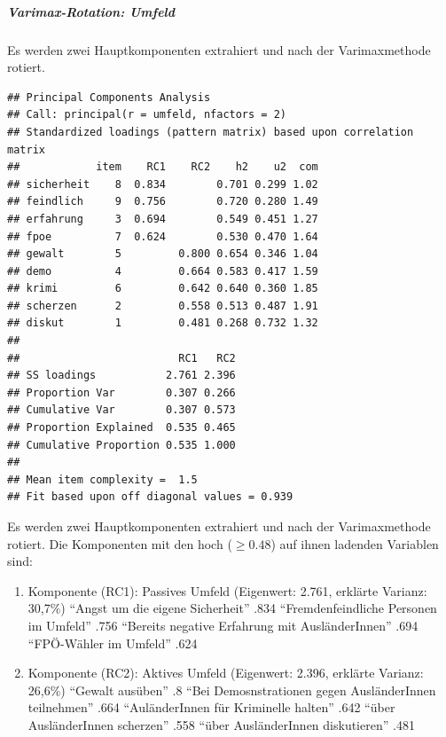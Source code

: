 \documentclass[]{article}
\newenvironment{Shaded}{\begin{snugshade}}{\end{snugshade}}
\newcommand{\KeywordTok}[1]{\textcolor[rgb]{0.13,0.29,0.53}{\textbf{{#1}}}}
\newcommand{\DataTypeTok}[1]{\textcolor[rgb]{0.13,0.29,0.53}{{#1}}}
\newcommand{\DecValTok}[1]{\textcolor[rgb]{0.00,0.00,0.81}{{#1}}}
\newcommand{\FloatTok}[1]{\textcolor[rgb]{0.00,0.00,0.81}{{#1}}}
\newcommand{\StringTok}[1]{\textcolor[rgb]{0.31,0.60,0.02}{{#1}}}
\newcommand{\OtherTok}[1]{\textcolor[rgb]{0.56,0.35,0.01}{{#1}}}
\newcommand{\NormalTok}[1]{{#1}}
\providecommand{\tightlist}{%
  \setlength{\itemsep}{0pt}\setlength{\parskip}{0pt}}
\let\oldsubparagraph\subparagraph
\renewcommand{\subparagraph}[1]{\oldsubparagraph{#1}\mbox{}}
\begin{document}
\subparagraph{Varimax-Rotation: Umfeld}\label{varimax-rotation-umfeld}

Es werden zwei Hauptkomponenten extrahiert und nach der Varimaxmethode
rotiert.

\begin{Shaded}
\end{Shaded}

\begin{verbatim}
## Principal Components Analysis
## Call: principal(r = umfeld, nfactors = 2)
## Standardized loadings (pattern matrix) based upon correlation matrix
##            item    RC1    RC2    h2    u2  com
## sicherheit    8  0.834        0.701 0.299 1.02
## feindlich     9  0.756        0.720 0.280 1.49
## erfahrung     3  0.694        0.549 0.451 1.27
## fpoe          7  0.624        0.530 0.470 1.64
## gewalt        5         0.800 0.654 0.346 1.04
## demo          4         0.664 0.583 0.417 1.59
## krimi         6         0.642 0.640 0.360 1.85
## scherzen      2         0.558 0.513 0.487 1.91
## diskut        1         0.481 0.268 0.732 1.32
## 
##                         RC1   RC2
## SS loadings           2.761 2.396
## Proportion Var        0.307 0.266
## Cumulative Var        0.307 0.573
## Proportion Explained  0.535 0.465
## Cumulative Proportion 0.535 1.000
## 
## Mean item complexity =  1.5
## Fit based upon off diagonal values = 0.939
\end{verbatim}

Es werden zwei Hauptkomponenten extrahiert und nach der Varimaxmethode
rotiert. Die Komponenten mit den hoch (\(\ge 0.48\)) auf ihnen ladenden
Variablen sind:

\begin{enumerate}
\def\labelenumi{\arabic{enumi}.}
\tightlist
\item
  Komponente (RC1): Passives Umfeld (Eigenwert: 2.761, erklärte Varianz:
  30,7\%) ``Angst um die eigene Sicherheit'' .834 ``Fremdenfeindliche
  Personen im Umfeld'' .756 ``Bereits negative Erfahrung mit
  AusländerInnen'' .694 ``FPÖ-Wähler im Umfeld'' .624
\item
  Komponente (RC2): Aktives Umfeld (Eigenwert: 2.396, erklärte Varianz:
  26,6\%) ``Gewalt ausüben'' .8 ``Bei Demosnstrationen gegen
  AusländerInnen teilnehmen'' .664 ``AuländerInnen für Kriminelle
  halten'' .642 ``über AusländerInnen scherzen'' .558 ``über
  AusländerInnen diskutieren'' .481
\end{enumerate}
\end{document}
